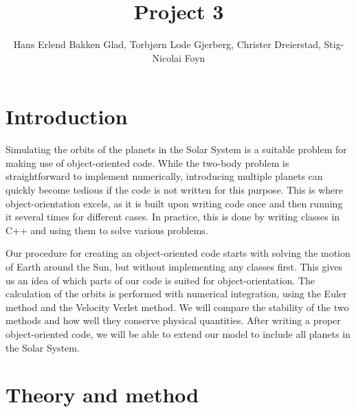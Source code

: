 \documentclass{emulateapj}
\begin{document}
\title{Project 3}

\author{Hans Erlend Bakken Glad, Torbjørn Lode Gjerberg, Christer Dreierstad, Stig-Nicolai Foyn}




\begin{abstract}

\end{abstract}

\section{Introduction}
\label{sec:introduction}

Simulating the orbits of the planets in the Solar System is a suitable problem for making use of object-oriented code. While the two-body problem is straightforward to implement numerically, introducing multiple planets can quickly become tedious if the code is not written for this purpose. This is where object-orientation excels, as it is built upon writing code once and then running it several times for different cases. In practice, this is done by writing classes in C++ and using them to solve various problems.

Our procedure for creating an object-oriented code starts with solving the motion of Earth around the Sun, but without implementing any classes first. This gives us an idea of which parts of our code is suited for object-orientation. The calculation of the orbits is performed with numerical integration, using the Euler method and the Velocity Verlet method. We will compare the stability of the two methods and how well they conserve physical quantities. After writing a proper object-oriented code, we will be able to extend our model to include all planets in the Solar System.

\section{Theory and method}
\label{sec:method}
\end{document}
